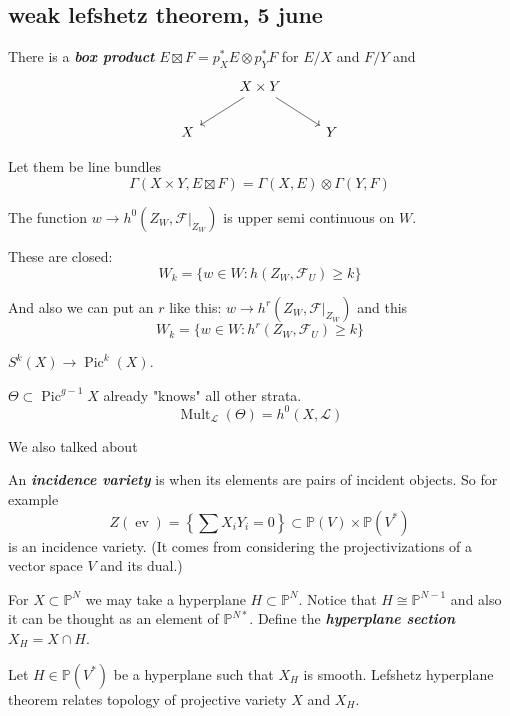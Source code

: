 \documentclass{article}
\renewcommand{\P}{\mathbb{P}}
\newcommand{\Fc}{\mathcal{F}}
\newcommand{\Lc}{\mathcal{L}}
\DeclareMathOperator{\Mult}{Mult}
\DeclareMathOperator{\Pic}{Pic}
\DeclareMathOperator{\ev}{ev}
\begin{document}
\subsection{weak lefshetz theorem, 5 june}
There is a \textbf{\textit{box product}} $E\boxtimes F=p_X^*E\otimes p_Y^*F$ for $E/X$ and $F/Y$ and
\[\begin{tikzcd}
	&X\times Y\arrow[dl]\arrow[dr]\\
	X&&Y
\end{tikzcd}\]
\begin{thm}
	Let them be line bundles
	\[\Gamma(X\times Y,E\boxtimes F)=\Gamma(X,E)\otimes\Gamma(Y,F)\]
\end{thm}
\begin{thm}
	The function $w\to h^0(Z_W,\Fc|_{Z_W})$ is upper semi continuous on $W$.
	
	These are closed:
	\[W_k=\{w\in W:h(Z_W,\Fc_U)\geq k\}\]
	
	And also we can put an $r$ like this: $w\to h^r(Z_W,\Fc|_{Z_W})$ and this
		\[W_k=\{w\in W:h^r(Z_W,\Fc_U)\geq k\}\]
\end{thm}
\begin{example}
	$S^k(X)\to\Pic^k(X)$.
\end{example}
\begin{thm}[Riemann]
	$\Theta\subset\Pic^{g-1}X$ already "knows" all other strata.
	\[\Mult_{\Lc}(\Theta)=h^0(X,\Lc)\]
\end{thm}
We also talked about
\begin{defn}
	An \textbf{\textit{incidence variety}} is when its elements are pairs of incident objects. So for example
	\[Z(\ev)=\left\{\sum X_iY_i=0\right\}\subset\P(V)\times\P(V^*)\]
	is an incidence variety. (It comes from considering the projectivizations of a vector space $V$ and its dual.)
\end{defn}
For $X\subset \P^N$ we may take a hyperplane $H\subset\P^N$. Notice that $H\cong\P^{N-1}$ and also it can be thought as an element of $\P^{N*}$. Define the \textbf{\textit{hyperplane section}} $X_H=X\cap H$.

Let $H\in\P(V^*)$ be a hyperplane such that $X_H$ is smooth. Lefshetz hyperplane theorem relates topology of projective variety $X$ and $X_H$.
\end{document}
